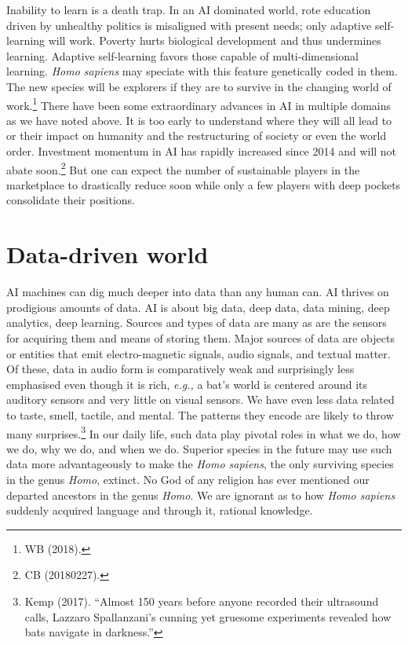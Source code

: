 \begin{multicols}{2}
Inability to learn is a death trap. In an AI dominated world, rote education driven by unhealthy politics is misaligned with present needs; only adaptive self-learning will work. Poverty hurts biological development and thus undermines learning. Adaptive self-learning favors those capable of multi-dimensional learning. \textit{Homo sapiens} may speciate with this feature genetically coded in them. The new species will be explorers if they are to survive in the changing world of work.\footnote{WB (2018).} There have been some extraordinary advances in AI in multiple domains as we have noted above. It is too early to understand where they will all lead to or their impact on humanity and the restructuring of society or even the world order. Investment momentum in AI has rapidly increased since 2014 and will not abate soon.\footnote{CB (20180227).}  But one can expect the number of sustainable players in the marketplace to drastically reduce soon while only a few players with deep pockets consolidate their positions.

\section{Data-driven world}

AI machines can dig much deeper into data than any human can. AI thrives on prodigious amounts of data. AI is about big data, deep data, data mining, deep analytics, deep learning. Sources and types of data are many as are the sensors for acquiring them and means of storing them. Major sources of data are objects or entities that emit electro-magnetic signals, audio signals, and textual matter. Of these, data in audio form is comparatively weak and surprisingly less emphasised even though it is rich, \textit{e.g.,} a bat's world is centered around its auditory sensors and very little on visual sensors. We have even less data related to taste, smell, tactile, and mental. The patterns they encode are likely to throw many surprises.\footnote{Kemp (2017). “Almost 150 years before anyone recorded their ultrasound calls, Lazzaro Spallanzani's cunning yet gruesome experiments revealed how bats navigate in darkness.”}  In our daily life, such data play pivotal roles in what we do, how we do, why we do, and when we do. Superior species in the future may use such data more advantageously to make the \textit{Homo sapiens}, the only surviving species in the genus \textit{Homo}, extinct. No God of any religion has ever mentioned our departed ancestors in the genus \textit{Homo}. We are ignorant as to how \textit{Homo sapiens} suddenly acquired language and through it, rational knowledge. 


\end{multicols}
